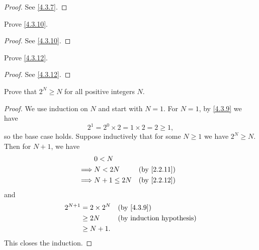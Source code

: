 \begin{proof}
  See \cref{4.3.7}.
\end{proof}

\begin{ex}\label{ex:4.3.3}
  Prove \cref{4.3.10}.
\end{ex}

\begin{proof}
  See \cref{4.3.10}.
\end{proof}

\begin{ex}
  Prove \cref{4.3.12}.
\end{ex}

\begin{proof}
  See \cref{4.3.12}.
\end{proof}

\begin{ex}\label{ex:4.3.5}
  Prove that \(2^N \geq N\) for all positive integers \(N\).
\end{ex}

\begin{proof}
  We use induction on \(N\) and start with \(N = 1\).
  For \(N = 1\), by \cref{4.3.9} we have
  \[
    2^1 = 2^0 \times 2 = 1 \times 2 = 2 \geq 1,
  \]
  so the base case holds.
  Suppose inductively that for some \(N \geq 1\) we have \(2^N \geq N\).
  Then for \(N + 1\), we have
  \begin{align*}
             & 0 < N                                        \\
    \implies & N < 2N        &  & \text{(by \cref{2.2.11})} \\
    \implies & N + 1 \leq 2N &  & \text{(by \cref{2.2.12})}
  \end{align*}
  and
  \begin{align*}
    2^{N + 1} & = 2 \times 2^N &  & \text{(by \cref{4.3.9})}         \\
              & \geq 2N        &  & \text{(by induction hypothesis)} \\
              & \geq N + 1.
  \end{align*}
  This closes the induction.
\end{proof}